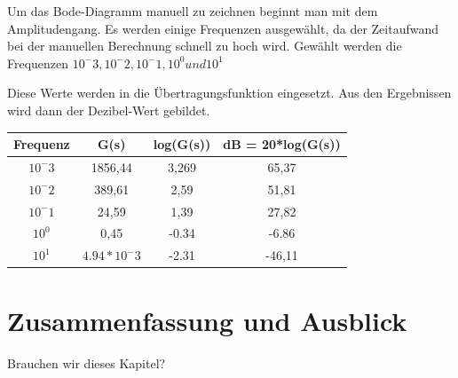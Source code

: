 \documentclass[            %
draft = false,             		%
paper = A4,                		%
pagesize = pdftex,         		%
fontsize = 10pt,           		%
DIV=15,                    		%
twoside = false,           		%
twocolumn = false,         		%
parskip = full,           		%
chapterprefix = false,      		%
appendixprefix = true,     		%
headinclude = false,       		%
footinclude = false,       		%
mpinclude = false,         		%
numbers = auto,            		%
cleardoublepage = plain,   		%
footnotes = multiple,      		%
titlepage = true,          		%
headings = normal,         		%
open = right,              		%
bibliography = openstyle,  		%
listof = chaptergapline,   		%
overfullrule = true,
]{scrbook}
\newcommand{\addtotoc}[1]{
\addcontentsline{toc}{chapter}{
   \texorpdfstring{
      \MakeUppercase{#1}
   }{#1}
   }
}
\begin{document}
Um das Bode-Diagramm manuell zu zeichnen beginnt man mit dem Amplitudengang.
Es werden einige Frequenzen ausgewählt, da der Zeitaufwand bei der manuellen Berechnung schnell zu hoch wird.
Gewählt werden die Frequenzen $10^-3, 10^-2, 10^-1, 10^0 und 10^1$

Diese Werte werden in die Übertragungsfunktion eingesetzt. Aus den Ergebnissen wird dann der Dezibel-Wert gebildet.

\begin{center}
\begin{tabular}{|c c c c|} 
 \hline
 Frequenz & G(s) & log(G(s)) & dB = 20*log(G(s)) \\ [0.5ex] 
 \hline
 $10^-3$ & 1856,44 & 3,269 & 65,37 \\
 \hline
 $10^-2$ & 389,61 & 2,59 & 51,81 \\
 \hline
 $10^-1$ & 24,59 & 1,39 & 27,82 \\
 \hline
 $10^0$ & 0,45 & -0.34 & -6.86 \\
 \hline
 $10^1$ & $4.94*10^-3$ & -2.31 & -46,11 \\
 \hline
\end{tabular}
\end{center}





{\let\clearpage\relax \chapter{Zusammenfassung und Ausblick}} \label{chpt:Conclusion}

Brauchen wir dieses Kapitel?









%
\end{document}
